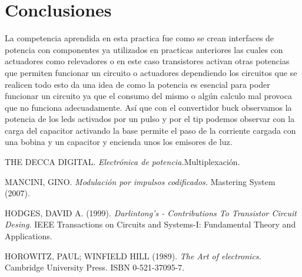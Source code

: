 \documentclass[11pt,a4paper]{article}
\begin{document}
\newpage

\section{Conclusiones}

La competencia aprendida en esta practica fue como se crean interfaces de potencia con componentes ya utilizados en practicas anteriores las cuales con actuadores como relevadores o en este caso transistores activan otras potencias que permiten funcionar un circuito o actuadores dependiendo los circuitos que se realicen todo esto da una idea de como la potencia es esencial para poder funcionar un circuito ya que el consumo del mismo o algún calculo mal provoca que no funciona adecuadamente. Así que con el convertidor buck observamos la potencia de los leds activados por un pulso y por el tip podemos observar con la carga del capacitor activando la base permite el paso de la corriente cargada con una bobina y un capacitor y encienda unos los emisores de luz. 


\begin{thebibliography}{X}

 \textsc{THE DECCA DIGITAL.} \textit{Electrónica de  potencia.}Multiplexación.

 \textsc{MANCINI, GINO.} \textit{Modulación por impulsos codificados.} 
Mastering System (2007).

 \textsc{HODGES, DAVID A. (1999).} \textit{Darlintong's - Contributions To Transistor Circuit Desing.} 
IEEE Transactions on Circuits and Systems-I: Fundamental Theory and Applications.

 \textsc{HOROWITZ, PAUL; WINFIELD HILL (1989).} \textit{The Art of electronics.} 
Cambridge University Press. ISBN 0-521-37095-7.


\end{thebibliography}


\end{document}
